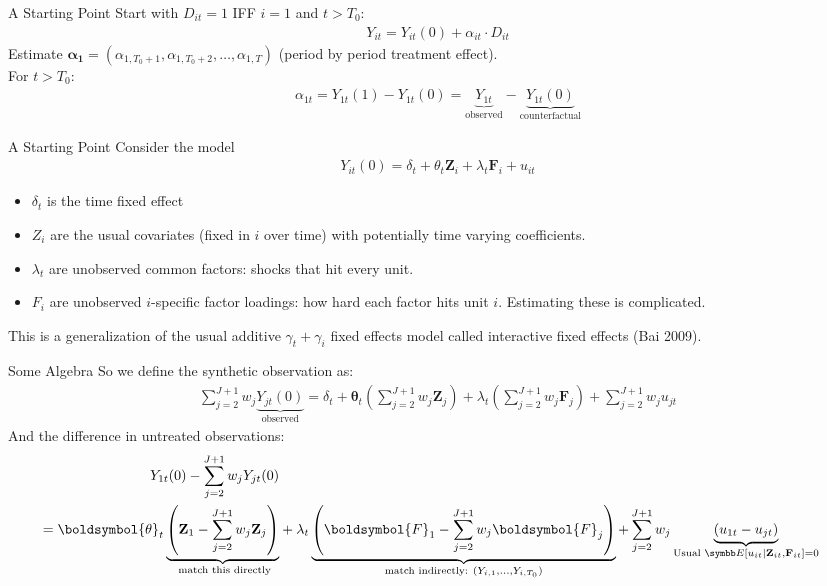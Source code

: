 \documentclass[aspectratio=169,11pt]{beamer}
\begin{document}
\begin{frame}{A Starting Point}
Start with $D_{it} =1$ IFF $i =1$ and $t > T_0$:
\begin{align*}
Y_{it} = Y_{it}(0)  + \alpha_{it} \cdot D_{it}
\end{align*}
Estimate $\mathbf{\boldsymbol{\alpha}_1} =(\alpha_{1, T_0+1},\alpha_{1, T_0+2},\ldots,\alpha_{1,T}) $ (period by period treatment effect).\\
 For $t > T_0$:
\begin{align*}
\alpha_{1 t}=Y_{1 t}(1)-Y_{1 t}(0)=\underbrace{Y_{1 t}}_{\text{observed}}-\underbrace{Y_{1 t}(0)}_{\text{counterfactual}}
\end{align*}

\end{frame}

\begin{frame}{A Starting Point}
Consider the model
\begin{align*}
Y_{i t}(0)=\delta_{t}+ \theta_{t} \mathbf{Z}_{i}+\lambda_{t} \mathbf{F}_{i}+u_{i t}
\end{align*}
\begin{itemize}
\item $\delta_t$ is the time fixed effect
\item $Z_i$ are the usual covariates (fixed in $i$ over time) with potentially time varying coefficients.
\item $\lambda_t$ are unobserved \alert{common factors}: shocks that hit every unit.
\item $F_i$ are unobserved $i$-specific \alert{factor loadings}: how hard each factor hits unit $i$. Estimating these is complicated.
\end{itemize}
This is a generalization of the usual additive $\gamma_t + \gamma_i$ fixed effects model called \alert{interactive fixed effects} (Bai 2009).
\end{frame}

\begin{frame}{Some Algebra}
So we define the synthetic observation as:
\begin{align*}
\sum_{j=2}^{J+1} w_{j} \underbrace{Y_{j t}(0)}_{\text{observed}}=\delta_{t}+\boldsymbol{\theta}_{t}\left(\sum_{j=2}^{J+1} w_{j} \mathbf{Z}_{j}\right)+\lambda_{t}\left(\sum_{j=2}^{J+1} w_{j} \boldsymbol{F}_{j}\right)+\sum_{j=2}^{J+1} w_{j} u_{j t}
\end{align*}
And the difference in untreated observations:
\begin{align*}
\begin{aligned}
Y_{1 t}(0)-\sum_{j=2}^{J+1} w_{j} Y_{j t}(0)\\
=\boldsymbol{\theta}_{t} \underbrace{\left( \mathbf{Z}_{1}-\sum_{j=2}^{J+1} w_{j} \mathbf{Z}_{j} \right)}_{\text{ match this directly}} 
&+\lambda_{t} \underbrace{\left(\boldsymbol{F}_{1}-\sum_{j=2}^{J+1} w_{j} \boldsymbol{F}_{j}\right)}_{\text{match indirectly:  }  (Y_{i,1},\ldots,Y_{i,T_0})}+\sum_{j=2}^{J+1} w_{j}\underbrace{\left(u_{1 t}-u_{j t}\right)}_{\text{Usual } \E[u_{it} \mid \mathbf{Z}_{it}, \mathbf{F}_{it} ]=0}
\end{aligned}
\end{align*}
\end{frame}
\end{document}
